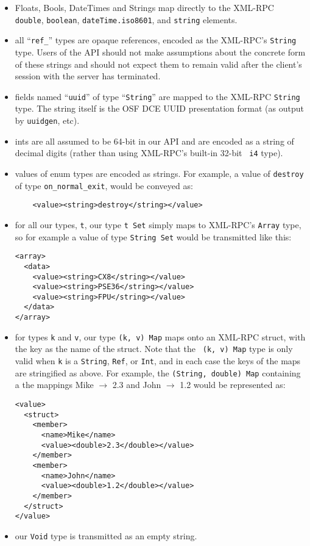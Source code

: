 \begin{itemize}
  \item Floats, Bools, DateTimes and Strings map directly to the XML-RPC {\tt
  double}, {\tt boolean}, {\tt dateTime.iso8601}, and {\tt string} elements.

  \item all ``{\tt ref\_}'' types are opaque references, encoded as the
  XML-RPC's {\tt String} type. Users of the API should not make assumptions
  about the concrete form of these strings and should not expect them to
  remain valid after the client's session with the server has terminated.

  \item fields named ``{\tt uuid}'' of type ``{\tt String}'' are mapped to
  the XML-RPC {\tt String} type. The string itself is the OSF
  DCE UUID presentation format (as output by {\tt uuidgen}, etc).

  \item ints are all assumed to be 64-bit in our API and are encoded as a
  string of decimal digits (rather than using XML-RPC's built-in 32-bit {\tt
  i4} type).

  \item values of enum types are encoded as strings. For example, a value of
  {\tt destroy} of type {\tt on\_normal\_exit}, would be conveyed as:
  \begin{verbatim}
    <value><string>destroy</string></value>
  \end{verbatim}

  \item for all our types, {\tt t}, our type {\tt t Set} simply maps to
  XML-RPC's {\tt Array} type, so for example a value of type {\tt String
  Set} would be transmitted like this:

  \begin{verbatim}
<array>
  <data>
    <value><string>CX8</string></value>
    <value><string>PSE36</string></value>
    <value><string>FPU</string></value>
  </data>
</array> 
  \end{verbatim}

  \item for types {\tt k} and {\tt v}, our type {\tt (k, v) Map} maps onto an
  XML-RPC struct, with the key as the name of the struct.  Note that the {\tt
  (k, v) Map} type is only valid when {\tt k} is a {\tt String}, {\tt Ref}, or
  {\tt Int}, and in each case the keys of the maps are stringified as
  above. For example, the {\tt (String, double) Map} containing a the mappings
  Mike $\rightarrow$ 2.3 and John $\rightarrow$ 1.2 would be represented as:

  \begin{verbatim}
<value>
  <struct>
    <member>
      <name>Mike</name>
      <value><double>2.3</double></value>
    </member>
    <member>
      <name>John</name>
      <value><double>1.2</double></value>
    </member>
  </struct>
</value>
  \end{verbatim}

  \item our {\tt Void} type is transmitted as an empty string.

\end{itemize}


